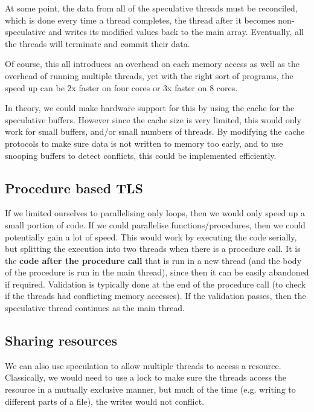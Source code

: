 At some point, the data from all of the speculative threads must be
reconciled, which is done every time a thread completes, the thread
after it becomes non-speculative and writes its modified values back
to the main array. Eventually, all the threads will terminate and
commit their data.


Of course, this all introduces an overhead on each memory access as
well as the overhead of running multiple threads, yet with the right
sort of programs, the speed up can be 2x faster on four cores or 3x
faster on 8 cores.

In theory, we could make hardware support for this by using the cache
for the speculative buffers. However since the cache size is very
limited, this would only work for small buffers, and/or small numbers
of threads. By modifying the cache protocols to make sure data is not
written to memory too early, and to use snooping buffers to detect
conflicts, this could be implemented efficiently.

\subsection{Procedure based TLS}

If we limited ourselves to parallelising only loops, then we would
only speed up a small portion of code. If we could parallelise
functions/procedures, then we could potentially gain a lot of
speed. This would work by executing the code serially, but splitting
the execution into two threads when there is a procedure call. It is
the \textbf{code after the procedure call} that is run in a new thread
(and the body of the procedure is run in the main thread), since then
it can be easily abandoned if required. Validation is typically done
at the end of the procedure call (to check if the threads had
conflicting memory accesses). If the validation passes, then the
speculative thread continues as the main thread.

\subsection{Sharing resources}

We can also use speculation to allow multiple threads to access a
resource. Classically, we would need to use a lock to make sure the
threads access the resource in a mutually exclusive manner, but much
of the time (e.g. writing to different parts of a file), the writes
would not conflict.

